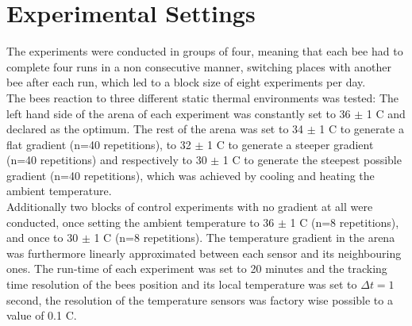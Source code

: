 \section{Experimental Settings}

The experiments were conducted in groups of four, meaning that each bee had to complete four runs in a non consecutive manner, switching places with another bee after each run, which led to a block size of eight experiments per day.
\\
The bees reaction to three different static thermal environments was tested: The left hand side of the arena of each experiment was constantly set to 36 $\pm$ 1 \textdegree C and declared as the optimum. The rest of the arena was set to 34 $\pm$ 1 \textdegree C to generate a flat gradient (n=40 repetitions), to 32 $\pm$ 1 \textdegree C to generate a steeper gradient (n=40 repetitions) and respectively to 30 $\pm$ 1 \textdegree C to generate the steepest possible gradient (n=40 repetitions), which was achieved by cooling and heating the ambient temperature.
\\
Additionally two blocks of control experiments with no gradient at all were conducted, once setting the ambient temperature to 36 $\pm$ 1 \textdegree C (n=8 repetitions), and once to 30 $\pm$ 1 \textdegree C (n=8 repetitions).
The temperature gradient in the arena was furthermore linearly approximated between each sensor and its neighbouring ones.
The run-time of each experiment was set to 20 minutes and the tracking time resolution of the bees position and its local temperature was set to $\Delta t = 1$ second, the resolution of the temperature sensors was factory wise possible to a value of 0.1 \textdegree C.

